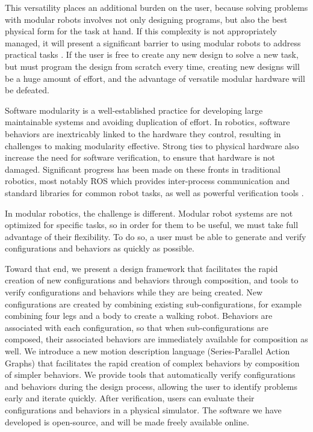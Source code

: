 \documentclass[conference]{IEEEtran}
\theoremstyle{definition}
\begin{document}
This versatility places an additional burden on the user, because
solving problems with modular robots involves not only designing  programs,
but also the best physical form for the task at hand. If this
complexity is not appropriately managed, it will present a significant barrier to
using modular robots to address practical tasks \cite{yim2000modular}. If the user is free to create any new design to
solve a new task, but must program the design from scratch every time, creating
new designs will be a huge amount of effort, and the advantage of versatile modular
hardware will be defeated.

Software modularity is a well-established practice for developing large
maintainable systems and avoiding duplication of effort. In robotics, software
behaviors are inextricably linked to the hardware they control, resulting in challenges to making modularity effective. Strong
ties to physical hardware also increase the need for software verification, to ensure
that hardware is not damaged. Significant progress has been made on these fronts
in traditional robotics, most notably
ROS \cite{Quigley2009} which provides inter-process communication and standard libraries for common robot tasks,
as well as powerful verification tools \cite{huang2014rosrv}.
  
In modular robotics, the challenge is different.  Modular robot systems are not optimized
for specific tasks, so in order for them to be useful, we must take full advantage of their flexibility. To do
so, a user must be able to generate and verify configurations and behaviors
as quickly as possible.  

Toward that end, we present a design framework that facilitates the rapid creation
of new configurations
and behaviors through composition, and tools to verify configurations and behaviors
while they are being created. New configurations are created by combining existing
sub-configurations,
for example combining four legs and a body to create a walking robot.
Behaviors are associated with each configuration, so that when sub-configurations
are composed, their associated behaviors are immediately available for composition
as well.
We introduce a new motion description language (Series-Parallel Action Graphs)
that facilitates the rapid creation of complex behaviors by composition of simpler
behaviors.
We provide tools that automatically verify configurations and behaviors during the
design process, allowing the user to identify problems early and iterate quickly.
After verification, users can  evaluate their configurations and behaviors in a physical simulator.
The software we have developed is open-source, and will be made freely available
online.
\end{document}
